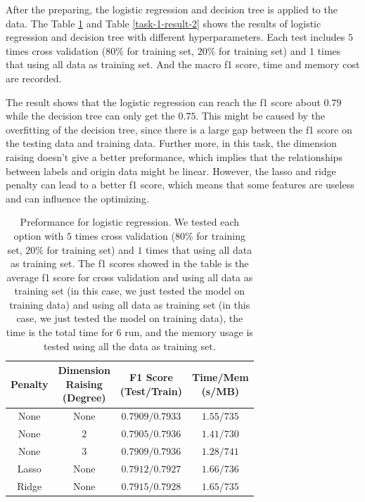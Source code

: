 \documentclass[11pt]{article}
\begin{document}
After the preparing, the logistic regression and decision tree is applied to the data. The Table \ref{task-1-result-1} and Table \ref{task-1-result-2} shows the results of logistic regression and decision tree with different hyperparameters. Each test includes $5$ times cross validation ($80\%$ for training set, $20\%$ for training set) and $1$ times that using all data as training set. And the macro f1 score, time and memory cost are recorded.

The result shows that the logistic regression can reach the f1 score about $0.79$ while the decision tree can only get the $0.75$. This might be caused by the overfitting of the decision tree, since there is a large gap between the f1 score on the testing data and training data. Further more, in this task, the dimension raising doesn't give a better preformance, which implies that the relationships between labels and origin data might be linear. However, the lasso and ridge penalty can lead to a better f1 score, which means that some features are useless and can influence the optimizing.

\begin{table}[H]
  \centering
  \begin{tabular}{|c|c|c|c|}
    \hline
    Penalty & \makecell{Dimension                                \\ Raising \\ (Degree)} & \makecell{F1 Score \\ (Test/Train)} & \makecell{Time/Mem \\ (s/MB)} \\
    \hline
    None    & None                & $0.7909/0.7933$ & $1.55/735$ \\
    \hline
    None    & $2$                 & $0.7905/0.7936$ & $1.41/730$ \\
    \hline
    None    & $3$                 & $0.7909/0.7936$ & $1.28/741$ \\
    \hline
    Lasso   & None                & $0.7912/0.7927$ & $1.66/736$ \\
    \hline
    Ridge   & None                & $0.7915/0.7928$ & $1.65/735$ \\
    \hline
  \end{tabular}
  \caption{Preformance for logistic regression. We tested each option with $5$ times cross validation ($80\%$ for training set, $20\%$ for training set) and $1$ times that using all data as training set. The f1 scores showed in the table is the average f1 score for cross validation and using all data as training set (in this case, we just tested the model on training data) and using all data as training set (in this case, we just tested the model on training data), the time is the total time for $6$ run, and the memory usage is tested using all the data as training set.}
  \label{task-1-result-1}
\end{table}
\end{document}
